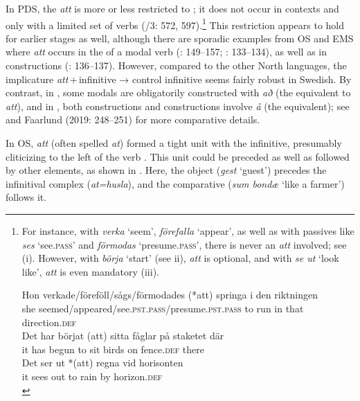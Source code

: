 \documentclass[output=paper]{langscibook}
\begin{document}
In PDS, the  \textit{att} is more or less restricted to ; it does not occur in  contexts and only with a limited set of  verbs (\citealt{TelemanEtAl1999}/3: 572, 597).\footnote{For instance, with \textit{verka} ‘seem’, \textit{förefalla} ‘appear’, as well as with passives like \textit{ses} ‘see.\textsc{pass}’ and \textit{förmodas} ‘presume.\textsc{pass}’, there is never an \textit{att} involved; see (i). However, with \textit{börja} ‘start’ (see ii), \textit{att} is optional, and with \textit{se ut} ‘look like’, \textit{att} is even mandatory (iii).

\ea \gll Hon   verkade/föreföll/sågs/förmodades     (*att)   springa   i    den   riktningen\\
        she   seemed/appeared/see\textsc{.pst.pass}/presume\textsc{.pst.pass} to     run     in   that   direction\textsc{.def}\\

\ex \gll Det   har börjat (att)   sitta   fåglar   på staketet     där\\
         it   has begun to   sit     birds   on fence\textsc{.def}   there\\
         
\ex \gll Det   ser     ut   *(att)   regna   vid   horisonten\\
    it   sees     out to     rain     by   horizon.\textsc{def}\\
\z} 
This restriction appears to hold for earlier stages as well, although there are sporadic examples from OS and EMS where \textit{att} occurs in the  of a modal verb (\citealt{Lagervall2014}: 149--157; \citealt{Kalm2016Satsekvivalenta}: 133–134), as well as in  constructions (\citealt{Kalm2016Satsekvivalenta}: 136–137). However, compared to the other North  languages, the implicature \textit{att}\,+\,infinitive → control infinitive seems fairly robust in Swedish. By contrast, in , some modals are obligatorily constructed with \textit{að} (the  equivalent to \textit{att}), and in , both  constructions and  constructions involve \textit{å} (the  equivalent); see \citet[45]{Kalm2016Satsekvivalenta} and Faarlund (2019: 248–251) for more comparative details.



In OS, \textit{att} (often spelled \textit{at}) formed a tight unit with the infinitive, presumably cliticizing to the left of the verb \citep{Falk2010Studier}. This unit could be preceded as well as followed by other elements, as shown in . Here, the object (\textit{gest} ‘guest’) precedes the infinitival complex (\textit{at=husla}), and the comparative  (\textit{sum bondæ} ‘like a farmer’) follows it.
\end{document}
